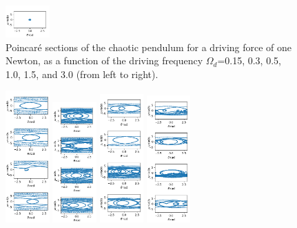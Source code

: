\documentclass[11pt]{article} %
\begin{document}
\begin{figure}[H]
        \includegraphics[width=0.15\textwidth]{pcr_1.0_3.0.png}
        \caption{Poincar\'e sections of the chaotic pendulum for a driving force of one Newton, as a function of the driving frequency $\Omega_d$=0.15, 0.3, 0.5, 1.0, 1.5, and 3.0 (from left to right).}
    \end{figure}
    \begin{figure}[H]
        \centering
        \includegraphics[width=0.15\textwidth]{pcr_2.0_0.15.png}
        \includegraphics[width=0.15\textwidth]{pcr_2.0_0.3.png}
        \includegraphics[width=0.15\textwidth]{pcr_2.0_0.5.png}
        \includegraphics[width=0.15\textwidth]{pcr_2.0_1.0.png}

\end{figure}
\end{document}
